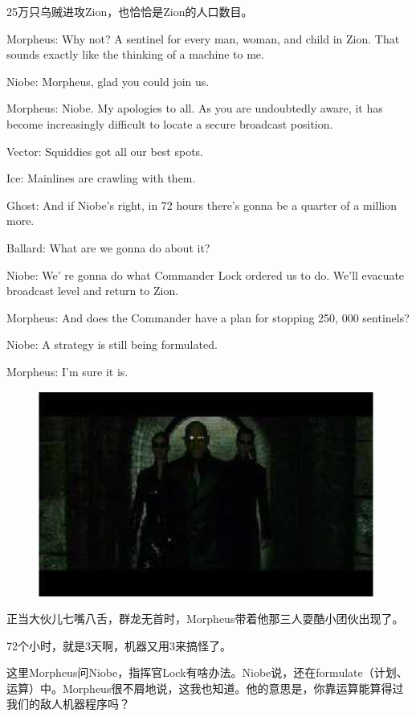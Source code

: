\documentclass{ctexart}
\newenvironment{myquote}{\color{green} \setlength{\leftskip}{6em} \setlength{\rightskip}{4em} \setlength{\parindent}{-2em}}{\par}
\begin{document}
25万只乌贼进攻Zion，也恰恰是Zion的人口数目。

\begin{myquote}
Morpheus: Why not? A sentinel for every man, woman, and child in Zion. That sounds exactly like the thinking of a machine to me.

Niobe: Morpheus, glad you could join us.

Morpheus: Niobe. My apologies to all. As you are undoubtedly aware, it has become increasingly difficult to locate a secure broadcast position.

Vector: Squiddies got all our best spots.

Ice: Mainlines are crawling with them.

Ghost: And if Niobe's right, in 72 hours there's gonna be a quarter of a million more.

Ballard: What are we gonna do about it?

Niobe: We' re gonna do what Commander Lock ordered us to do. We'll evacuate broadcast level and return to Zion.

Morpheus: And does the Commander have a plan for stopping 250, 000 sentinels?

Niobe: A strategy is still being formulated.

Morpheus: I'm sure it is.
\end{myquote}

\begin{figure}[htb]
\centering
\includegraphics[width=0.5\linewidth]{fig/read_reloaded-16}
\end{figure}

正当大伙儿七嘴八舌，群龙无首时，Morpheus带着他那三人耍酷小团伙出现了。

72个小时，就是3天啊，机器又用3来搞怪了。

这里Morpheus问Niobe，指挥官Lock有啥办法。Niobe说，还在formulate（计划、运算）中。Morpheus很不屑地说，这我也知道。他的意思是，你靠运算能算得过我们的敌人机器程序吗？
\end{document}
